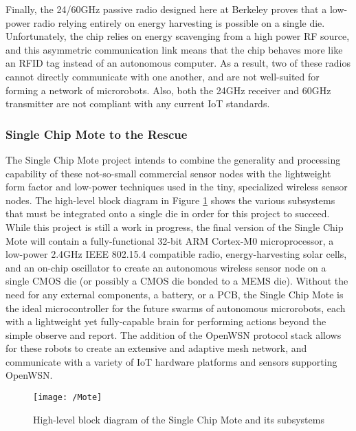 Finally, the 24/60GHz passive radio designed here at Berkeley \cite{ali-radio} proves that a low-power radio relying entirely on energy harvesting is possible on a single die. Unfortunately, the chip relies on energy scavenging from a high power RF source, and this asymmetric communication link means that the chip behaves more like an RFID tag instead of an autonomous computer. As a result, two of these radios cannot directly communicate with one another, and are not well-suited for forming a network of microrobots. Also, both the 24GHz receiver and 60GHz transmitter are not compliant with any current IoT standards.

\subsubsection{Single Chip Mote to the Rescue}
The Single Chip Mote project intends to combine the generality and processing capability of these not-so-small commercial sensor nodes with the lightweight form factor and low-power techniques used in the tiny, specialized wireless sensor nodes. The high-level block diagram in Figure \ref{fig:Mote} shows the various subsystems that must be integrated onto a single die in order for this project to succeed. While this project is still a work in progress, the final version of the Single Chip Mote will contain a fully-functional 32-bit ARM Cortex-M0 microprocessor, a low-power 2.4GHz IEEE 802.15.4 compatible radio, energy-harvesting solar cells, and an on-chip oscillator to create an autonomous wireless sensor node on a single CMOS die (or possibly a CMOS die bonded to a MEMS die). Without the need for any external components, a battery, or a PCB, the Single Chip Mote is the ideal microcontroller for the future swarms of autonomous microrobots, each with a lightweight yet fully-capable brain for performing actions beyond the simple observe and report. The addition of the OpenWSN protocol stack allows for these robots to create an extensive and adaptive mesh network, and communicate with a variety of IoT hardware platforms and sensors supporting OpenWSN.

\begin{figure}
\centering
\texttt{[image: /Mote]}
\caption{High-level block diagram of the Single Chip Mote and its subsystems}
\label{fig:Mote}
\end{figure}

